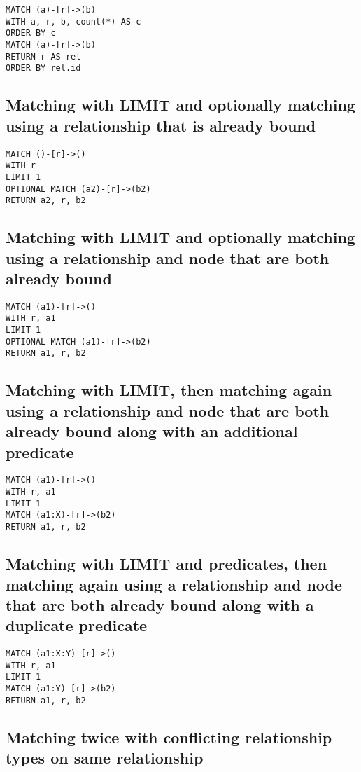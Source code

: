 \begin{lstlisting}
MATCH (a)-[r]->(b)
WITH a, r, b, count(*) AS c
ORDER BY c
MATCH (a)-[r]->(b)
RETURN r AS rel
ORDER BY rel.id
\end{lstlisting}

\subsection{Matching with LIMIT and optionally matching using a relationship that is already bound}

\begin{lstlisting}
MATCH ()-[r]->()
WITH r
LIMIT 1
OPTIONAL MATCH (a2)-[r]->(b2)
RETURN a2, r, b2
\end{lstlisting}

\subsection{Matching with LIMIT and optionally matching using a relationship and node that are both already bound}

\begin{lstlisting}
MATCH (a1)-[r]->()
WITH r, a1
LIMIT 1
OPTIONAL MATCH (a1)-[r]->(b2)
RETURN a1, r, b2
\end{lstlisting}

\subsection{Matching with LIMIT, then matching again using a relationship and node that are both already bound along with an additional predicate}

\begin{lstlisting}
MATCH (a1)-[r]->()
WITH r, a1
LIMIT 1
MATCH (a1:X)-[r]->(b2)
RETURN a1, r, b2
\end{lstlisting}

\subsection{Matching with LIMIT and predicates, then matching again using a relationship and node that are both already bound along with a duplicate predicate}

\begin{lstlisting}
MATCH (a1:X:Y)-[r]->()
WITH r, a1
LIMIT 1
MATCH (a1:Y)-[r]->(b2)
RETURN a1, r, b2
\end{lstlisting}

\subsection{Matching twice with conflicting relationship types on same relationship}

